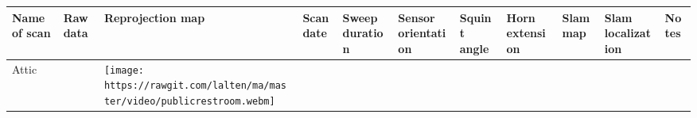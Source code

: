 \begin{longtable}[]{@{}lllllllllll@{}}
\toprule
\begin{minipage}[b]{0.04\columnwidth}\raggedright\strut
Name of scan\strut
\end{minipage} & \begin{minipage}[b]{0.04\columnwidth}\raggedright\strut
Raw data\strut
\end{minipage} & \begin{minipage}[b]{0.04\columnwidth}\raggedright\strut
Reprojection map\strut
\end{minipage} & \begin{minipage}[b]{0.04\columnwidth}\raggedright\strut
Scan date\strut
\end{minipage} & \begin{minipage}[b]{0.04\columnwidth}\raggedright\strut
Sweep duration\strut
\end{minipage} & \begin{minipage}[b]{0.04\columnwidth}\raggedright\strut
Sensor orientation\strut
\end{minipage} & \begin{minipage}[b]{0.04\columnwidth}\raggedright\strut
Squint angle\strut
\end{minipage} & \begin{minipage}[b]{0.04\columnwidth}\raggedright\strut
Horn extension\strut
\end{minipage} & \begin{minipage}[b]{0.04\columnwidth}\raggedright\strut
Slam map\strut
\end{minipage} & \begin{minipage}[b]{0.04\columnwidth}\raggedright\strut
Slam localization\strut
\end{minipage} & \begin{minipage}[b]{0.04\columnwidth}\raggedright\strut
Notes\strut
\end{minipage}\tabularnewline
\midrule
\endhead
\begin{minipage}[t]{0.04\columnwidth}\raggedright\strut
Attic\strut
\end{minipage} & \begin{minipage}[t]{0.04\columnwidth}\raggedright\strut
\strut
\end{minipage} & \begin{minipage}[t]{0.04\columnwidth}\raggedright\strut
\texttt{[image: https://rawgit.com/lalten/ma/master/video/publicrestroom.webm]}\strut
\end{minipage} & \begin{minipage}[t]{0.04\columnwidth}\raggedright\strut

\end{minipage}
\end{longtable}
